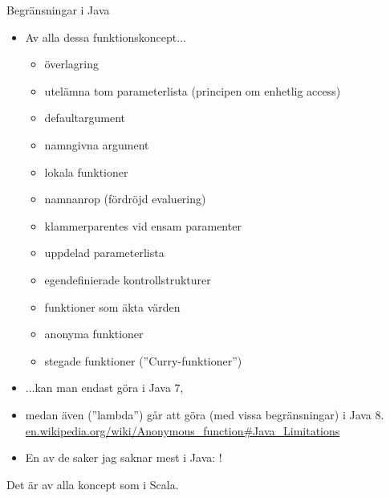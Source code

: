 \begin{Slide}{Begränsningar i Java}\SlideFontTiny
\begin{itemize}
\item Av alla dessa funktionskoncept...
\begin{itemize}\SlideFontTiny
\item överlagring
\item utelämna tom parameterlista (principen om enhetlig access)
\item defaultargument
\item namngivna argument
\item lokala funktioner
\item namnanrop (fördröjd evaluering)
\item klammerparentes vid ensam paramenter
\item uppdelad parameterlista
\item egendefinierade kontrollstrukturer
\item funktioner som äkta värden
\item anonyma funktioner
\item stegade funktioner (''Curry-funktioner'')
\end{itemize}
\item ...kan man endast göra  i Java 7,
\item medan även  (''lambda'') går att göra (med vissa begränsningar) i Java 8. \href{https://en.wikipedia.org/wiki/Anonymous_function\#Java_Limitations}{en.wikipedia.org/wiki/Anonymous\_function\#Java\_Limitations}
\item \vspace{0.5em} En av de saker jag saknar mest i Java: !
\end{itemize}
Det är  av alla koncept som  i Scala.

\end{Slide}



